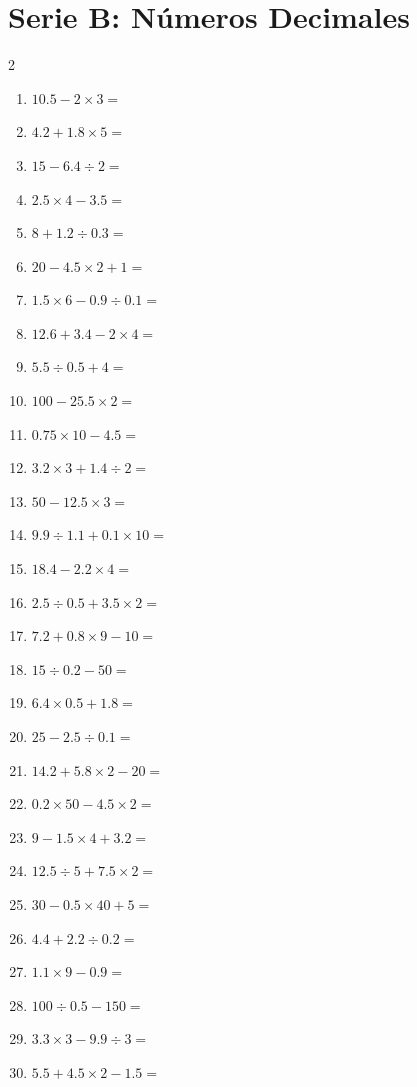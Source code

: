 \documentclass[11pt, letterpaper]{article}
\begin{document}
\newpage

\section*{Serie B: Números Decimales}
\begin{multicols}{2}
	\begin{enumerate}[label=\textbf{\arabic*.}, start=31, itemsep=2.2cm]
		\item $10.5 - 2 \times 3 =$
		\item $4.2 + 1.8 \times 5 =$
		\item $15 - 6.4 \div 2 =$
		\item $2.5 \times 4 - 3.5 =$
		\item $8 + 1.2 \div 0.3 =$
		\item $20 - 4.5 \times 2 + 1 =$
		\item $1.5 \times 6 - 0.9 \div 0.1 =$
		\item $12.6 + 3.4 - 2 \times 4 =$
		\item $5.5 \div 0.5 + 4 =$
		\item $100 - 25.5 \times 2 =$
		\item $0.75 \times 10 - 4.5 =$
		\item $3.2 \times 3 + 1.4 \div 2 =$
		\item $50 - 12.5 \times 3 =$
		\item $9.9 \div 1.1 + 0.1 \times 10 =$
		\item $18.4 - 2.2 \times 4 =$
		\item $2.5 \div 0.5 + 3.5 \times 2 =$
		\item $7.2 + 0.8 \times 9 - 10 =$
		\item $15 \div 0.2 - 50 =$
		\item $6.4 \times 0.5 + 1.8 =$
		\item $25 - 2.5 \div 0.1 =$
		\item $14.2 + 5.8 \times 2 - 20 =$
		\item $0.2 \times 50 - 4.5 \times 2 =$
		\item $9 - 1.5 \times 4 + 3.2 =$
		\item $12.5 \div 5 + 7.5 \times 2 =$
		\item $30 - 0.5 \times 40 + 5 =$
		\item $4.4 + 2.2 \div 0.2 =$
		\item $1.1 \times 9 - 0.9 =$
		\item $100 \div 0.5 - 150 =$
		\item $3.3 \times 3 - 9.9 \div 3 =$
		\item $5.5 + 4.5 \times 2 - 1.5 =$
	\end{enumerate}
\end{multicols}
\end{document}
